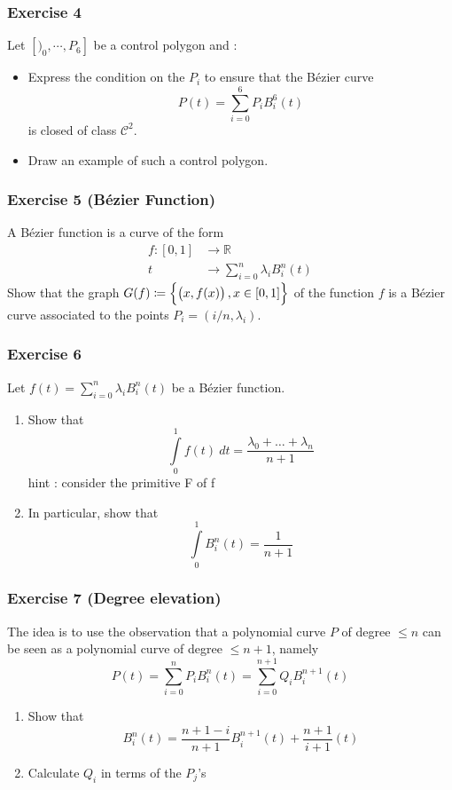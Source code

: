 \subsubsection{Exercise 4}
Let $ [)_0, \cdots, P_6]  $ be a control polygon and : 
\begin{itemize}
  \item Express the condition on the $ P_i $ to ensure that the Bézier curve 
      \[
          P(t) = \sum_{i=0}^{6} P_iB^6_i(t) 
      \]
      is closed of class $ \mathscr{ C } ^2 $.
  \item Draw an example of such a control polygon.
\end{itemize}

\subsubsection{Exercise 5 (Bézier Function) }
A Bézier function is a curve of the form 
\begin{align*}
    f : [0,1] &\to \mathbb{R}\\
    t &\to \sum_{i=0}^{n} \lambda_i B_i^n(t) 
\end{align*}
Show that the graph  $ G(f) \coloneqq \set{ \left( x,f(x)\right) , x \in [0,1] }  $ of the
function $ f $ is a Bézier curve associated to the points $ P_i = \left( i/n, \lambda_i
\right)  $.

\subsubsection{Exercise 6}
Let $ f(t) = \sum_{i=0}^{n} \lambda_iB^n_i(t)  $ be a Bézier function. 
\begin{enumerate}
    \item Show that 
        \[
        \int\limits_{0}^{1} f(t) \ dt = \frac{ \lambda_0 + \dots + \lambda_n }{ n+1 } 
        \]
        hint : consider the primitive F of f
    \item In particular, show that 
        \[
            \int\limits_{0}^{1} B^n_i(t) = \frac{ 1 }{ n+1 } 
        \]
\end{enumerate}
\subsubsection{Exercise 7 (Degree elevation) }
The idea is to use the observation that a polynomial curve $ P $ of degree $ \leq n  $ can
be seen as a polynomial curve of degree $ \leq n+1 $, namely 
\[
    P(t) = \sum_{i=0}^{n} P_iB^n_i(t) = \sum_{i=0}^{n+1} Q_iB _{ i }^{ n+1 } (t) 
\] 
\begin{enumerate}
    \item Show that 
        \[
            B _{ i }^{ n  } (t) = \frac{ n+1 - i }{ n+1 } B _{ i }^{ n+1 } (t) + \frac{
            n+1  }{ i+1 } (t) 
        \]
    \item Calculate $ Q_i $ in terms of the $ P_j $'s
\end{enumerate}


